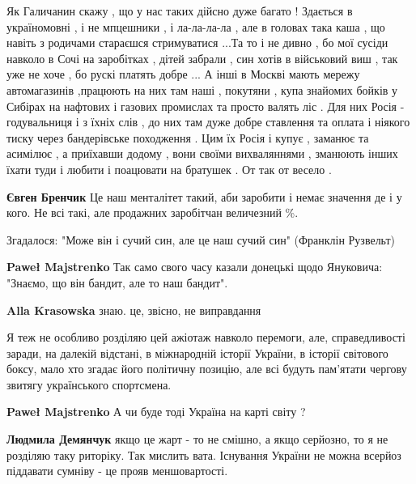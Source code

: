 \begin{itemize}

Як Галичанин скажу , що у нас таких дійсно дуже багато ! Здається в
україномовні , і не мпцешники , і ла-ла-ла-ла , але в головах така каша , що
навіть з родичами стараєшся стримуватися ...Та то і не дивно , бо мої сусіди
навколо в Сочі на заробітках , дітей забрали , син хотів в військовий виш , так
уже не хоче , бо рускі платять добре ... А інші в Москві мають мережу
автомагазинів ,працюють на них там наші , покутяни , купа знайомих бойків у
Сибірах на нафтових і газових промислах та просто валять ліс . Для них Росія -
годувальниця і з їхніх слів , до них там дуже добре ставлення та оплата і
ніякого тиску через бандерівське походження . Цим їх Росія і купує , заманює та
асимілює , а приїхавши додому , вони своїми вихваляннями , зманюють інших їхати
туди і любити і поацювати на братушек . От так от весело .

\begin{itemize} %
\textbf{Євген Бренчик}
Це наш менталітет такий, аби заробити і немає значення де і у кого.
Не всі такі, але продажних заробітчан величезний \%.
\end{itemize} %


Згадалося: "Може він і сучий син, але це наш сучий син" (Франклін Рузвельт)

\begin{itemize} %
\textbf{Paweł Majstrenko}
Так само свого часу казали донецькі щодо Януковича: "Знаємо, що він бандит, але то наш бандит".

\textbf{Alla Krasowska} знаю. це, звісно, не виправдання
\end{itemize} %


Я теж не особливо розділяю цей ажіотаж навколо перемоги, але, справедливості
заради, на далекій відстані, в міжнародній історії України, в історії світового
боксу, мало хто згадає його політичну позицію, але всі будуть пам'ятати чергову
звитягу українського спортсмена.

\begin{itemize} %
\textbf{Paweł Majstrenko} А чи буде тоді Україна на карті світу ?

\textbf{Людмила Демянчук} якщо це жарт - то не смішно, а якщо серйозно, то я не розділяю таку риторіку. Так мислить вата. Існування України не можна всерйоз піддавати сумніву - це прояв меншовартості.
\end{itemize} %


\end{itemize}
